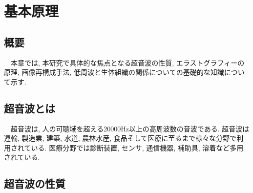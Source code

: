 \chapter{基本原理}
\section{概要}
　本章では, 本研究で具体的な焦点となる超音波の性質, エラストグラフィーの原理, 画像再構成手法, 低周波と生体組織の関係についての基礎的な知識について示す.

\section{超音波とは}
　超音波は, 人の可聴域を超える20000Hz以上の高周波数の音波である. 超音波は運輸, 製造業, 建築, 水道, 農林水産, 食品そして医療に至るまで様々な分野で利用されている. 医療分野では診断装置, センサ, 通信機器, 補助具, 溶着など多用されている. 

\section{超音波の性質}

